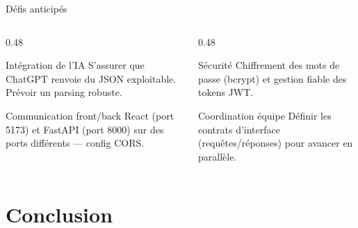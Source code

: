 \documentclass[aspectratio=169, 10pt]{beamer}
\begin{document}
\begin{frame}{Défis anticipés}
\begin{columns}[T]
\begin{column}{0.48\textwidth}
\begin{alertedblock}{Intégration de l'IA}
\footnotesize S'assurer que ChatGPT renvoie du JSON exploitable. Prévoir un parsing robuste.
\end{alertedblock}
\vspace{0.15cm}
\begin{block}{Communication front/back}
\footnotesize React (port 5173) et FastAPI (port 8000) sur des ports différents — config CORS.
\end{block}
\end{column}
\begin{column}{0.48\textwidth}
\begin{alertedblock}{Sécurité}
\footnotesize Chiffrement des mots de passe (bcrypt) et gestion fiable des tokens JWT.
\end{alertedblock}
\vspace{0.15cm}
\begin{block}{Coordination équipe}
\footnotesize Définir les contrats d'interface (requêtes/réponses) pour avancer en parallèle.
\end{block}
\end{column}
\end{columns}
\end{frame}

\section{Conclusion}
\end{document}

